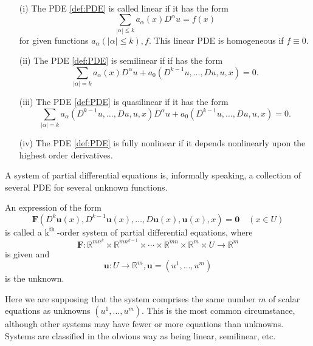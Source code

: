 \begin{definition}
~\
\begin{itemize}
    \item[(i)] The PDE \eqref{def:PDE} is called linear if it has the form
    \[
        \sum_{|\alpha| \leq k} a_{\alpha}(x) D^{\alpha} u=f(x)
    \] 
    for given functions $a_\alpha (|\alpha|\le k), f$. This linear PDE is homogeneous if $f\equiv 0$.
    \item[(ii)] The PDE \eqref{def:PDE} is semilinear if if has the form
    \[
        \sum_{|\alpha|=k} a_{\alpha}(x) D^{\alpha} u+a_{0}\left(D^{k-1} u, \ldots, D u, u, x\right)=0.  
    \]
    \item[(iii)] The PDE \eqref{def:PDE} is quasilinear if it has the form
    \[
        \sum_{|\alpha|=k} a_{\alpha}\left(D^{k-1} u, \ldots, D u, u, x\right) D^{\alpha} u+a_{0}\left(D^{k-1} u, \ldots, D u, u, x\right)=0.
    \] 
    \item[(iv)] The PDE \eqref{def:PDE} is fully nonlinear if it depends nonlinearly upon the highest order derivatives.
\end{itemize}
\end{definition}

A system of partial differential equations is, informally speaking, a collection
of several PDE for several unknown functions.

\begin{definition}
     An expression of the form
\begin{equation}
\label{def:sysPDE}
    \mathbf{F}\left(D^{k} \mathbf{u}(x), D^{k-1} \mathbf{u}(x), \ldots, D \mathbf{u}(x), \mathbf{u}(x), x\right)=\mathbf{0} \quad(x \in U)
\end{equation}
is called a $\mathrm{k}^{\text {th }}$-order system of partial differential equations, where
$$
\mathbf{F}: \mathbb{R}^{m n^{k}} \times \mathbb{R}^{m n^{k-1}} \times \cdots \times \mathbb{R}^{m n} \times \mathbb{R}^{m} \times U \rightarrow \mathbb{R}^{m}
$$
is given and
$$
\mathbf{u}: U \rightarrow \mathbb{R}^{m}, \mathbf{u}=\left(u^{1}, \ldots, u^{m}\right)
$$
is the unknown.
\end{definition}
Here we are supposing that the system comprises the same number $m$ of scalar equations as unknowns $\left(u^{1}, \ldots, u^{m}\right)$. This is the most common circumstance, although other systems may have fewer or more equations than unknowns. Systems are classified in the obvious way as being linear, semilinear, etc.

